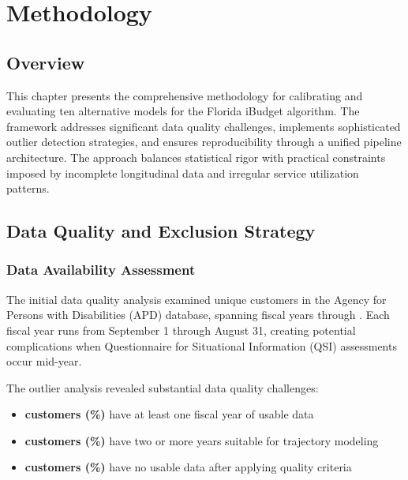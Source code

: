 \chapter{Methodology}



\section{Overview}

This chapter presents the comprehensive methodology for calibrating and evaluating ten alternative models for the Florida iBudget algorithm. The framework addresses significant data quality challenges, implements sophisticated outlier detection strategies, and ensures reproducibility through a unified pipeline architecture. The approach balances statistical rigor with practical constraints imposed by incomplete longitudinal data and irregular service utilization patterns.




\section{Data Quality and Exclusion Strategy}

\subsection{Data Availability Assessment}

The initial data quality analysis examined \TheTotalNumberCustomers{} unique customers in the Agency for Persons with Disabilities (APD) database, spanning fiscal years \TheInitialYear{} through \TheFinalYear{}. Each fiscal year runs from September 1 through August 31, creating potential complications when Questionnaire for Situational Information (QSI) assessments occur mid-year.

The outlier analysis revealed substantial data quality challenges:
\begin{itemize}
    \item \textbf{\CustomerNumberOneYear{} customers (\CustomerPctOneYear\%)} have at least one fiscal year of usable data
    \item \textbf{\CustomerNumberTwoPlusYear{} customers (\CustomerPctTwoPlusYear\%)} have two or more years suitable for trajectory modeling
    \item \textbf{\CustomerNumberNoData{} customers (\CustomerPctNoData\%)} have no usable data after applying quality criteria
\end{itemize}

